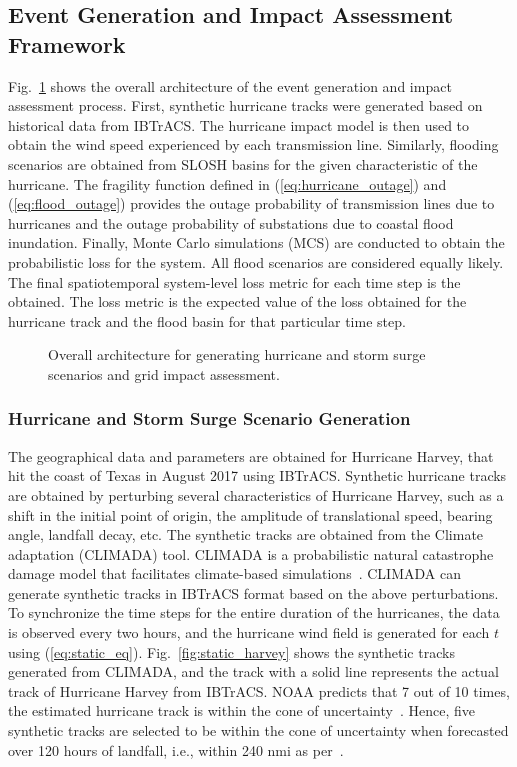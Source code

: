 \subsection{Event Generation and Impact Assessment Framework}
Fig.~\ref{fig:overall_architecture} shows the overall architecture of the event generation and impact assessment process. First, synthetic hurricane tracks were generated based on historical data from IBTrACS. The hurricane impact model is then used to obtain the wind speed experienced by each transmission line. Similarly, flooding scenarios are obtained from SLOSH basins for the given characteristic of the hurricane. The fragility function defined in (\ref{eq:hurricane_outage}) and (\ref{eq:flood_outage}) provides the outage probability of transmission lines due to hurricanes and the outage probability of substations due to coastal flood inundation. Finally, Monte Carlo simulations (MCS) are conducted to obtain the probabilistic loss for the system. All flood scenarios are considered equally likely. The final spatiotemporal system-level loss metric for each time step is the obtained. The loss metric is the expected value of the loss obtained for the hurricane track and the flood basin for that particular time step.


\begin{figure}[t]
    \centering
   \caption{Overall architecture for generating hurricane and storm surge scenarios and grid impact assessment.}
    \label{fig:overall_architecture}
    \vspace{-5pt}
\end{figure}

\subsubsection{Hurricane and Storm Surge Scenario Generation}
The geographical data and parameters are obtained for Hurricane Harvey, that hit the coast of Texas in August 2017 using IBTrACS. Synthetic hurricane tracks are obtained by perturbing several characteristics of Hurricane Harvey, such as a shift in the initial point of origin, the amplitude of translational speed, bearing angle, landfall decay, etc. The synthetic tracks are obtained from the Climate adaptation (CLIMADA) tool. CLIMADA is a probabilistic natural catastrophe damage model that facilitates climate-based simulations~\cite{Climada}. CLIMADA can generate synthetic tracks in IBTrACS format based on the above perturbations. To synchronize the time steps for the entire duration of the hurricanes, the data is observed every two hours, and the hurricane wind field is generated for each $t$ using (\ref{eq:static_eq}). Fig.~\ref{fig:static_harvey} shows the synthetic tracks generated from CLIMADA, and the track with a solid line represents the actual track of Hurricane Harvey from IBTrACS. NOAA predicts that 7 out of 10 times, the estimated hurricane track is within the cone of uncertainty~\cite{NOAA_uncertainty}. Hence, five synthetic tracks are selected to be within the cone of uncertainty when forecasted over 120 hours of landfall, i.e., within 240 nmi as per~\cite{NOAA_uncertainty}.   

